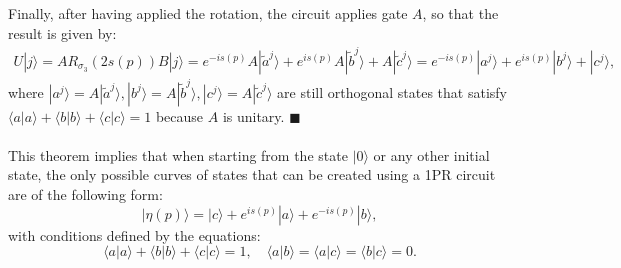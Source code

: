 \documentclass[10pt,letterpaper]{article} %
\begin{document}
Finally, after having applied the rotation, the circuit applies gate $A$, 
so that the result is given by:
\begin{eqnarray*}
U|j\rangle = AR_{\sigma_3}(2s(p)) B|j\rangle = e^{-is(p)} A |\tilde{a}^j\rangle + e^{is(p)} A |\tilde{b}^j\rangle + A |\tilde{c}^j\rangle = e^{-is(p)} |a^j\rangle + e^{is(p)} |b^j\rangle + |c^j\rangle,
\end{eqnarray*}
where $|a^j\rangle = A |\tilde{a}^j\rangle, |b^j\rangle = A |\tilde{b}^j\rangle, |c^j\rangle = A |\tilde{c}^j\rangle$ are still orthogonal
states that satisfy $\langle a| a\rangle + \langle b| b\rangle + \langle c| c\rangle = 1$ because $A$ is unitary. $\blacksquare$  \\
 $\;$ \\

This theorem implies that when starting from the state $|0\rangle$ 
or any other initial state, the only possible curves of states that can be 
created using a 1PR circuit are of the following form:
\begin{equation}
|\eta(p)\rangle = |c\rangle + e^{is(p)}|a\rangle + e^{-is(p)} |b\rangle,
\label{eq:curve-states}
\end{equation}
with conditions defined by the equations: 
\begin{equation}
\langle a| a\rangle + \langle b| b\rangle + \langle c| c\rangle = 1,  \quad
\langle a |b\rangle =
\langle a |c\rangle =
\langle b |c\rangle = 0.
\label{eq:conditions-vecs}
\end{equation}
\end{document}
